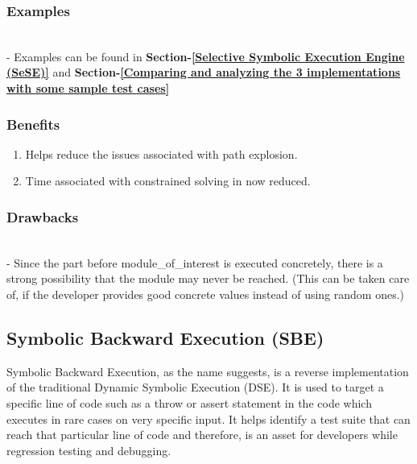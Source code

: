 \documentclass[11pt]{llncs}
\begin{document}
		\subsubsection{Examples}
			~\\
			\vspace{1mm}
			- Examples can be found in \textbf{Section-\ref{Selective Symbolic Execution Engine (SeSE)}} and \textbf{Section-\ref{Comparing and analyzing the 3 implementations with some sample test cases}}
		
		\vspace{-1.5mm}

		\subsubsection{Benefits}
			\begin{enumerate}
				\vspace{-0.7mm}
				\item Helps reduce the issues associated with path explosion.
				\item Time associated with constrained solving in now reduced.
			\end{enumerate}
			
		\vspace{-3mm}
			
		\subsubsection{Drawbacks}
			~\\
			\vspace{1mm}
			- Since the part before module\_of\_interest is executed concretely, there is a strong possibility that the module may never be reached. (This can be taken care of, if the developer provides good concrete values instead of using random ones.)

	
	\subsection{Symbolic Backward Execution (SBE)}
		Symbolic Backward Execution, as the name suggests, is a reverse implementation of the traditional Dynamic Symbolic Execution (DSE). It is used to target a specific line of code such as a throw or assert statement in the code which executes in rare cases on very specific input. It helps identify a test suite that can reach that particular line of code and therefore, is an asset for developers while regression testing and debugging.
\end{document}
